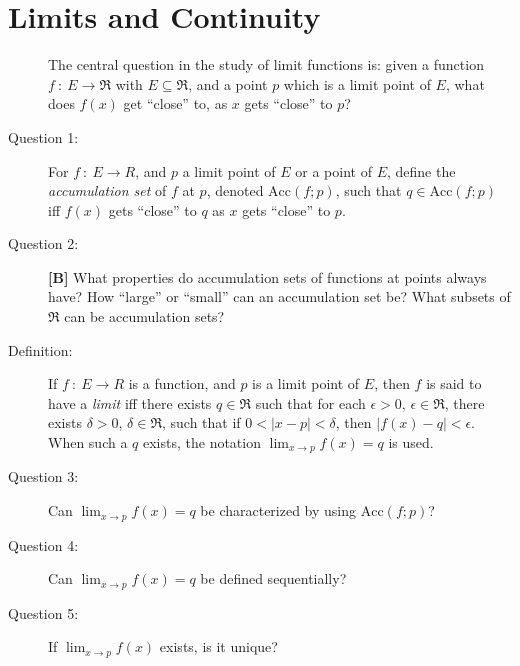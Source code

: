 \documentclass{article}
\begin{document}
\newpage

\section{Limits and Continuity}

\begin{description}

  \item[] The central question in the study of limit functions is: given a function $f\ :\ E \to \Re$ with $E \subseteq \Re$, and a point $p$ which is a limit point of $E$, what does $f(x)$ get ``close'' to, as $x$ gets ``close'' to $p$?

  \item[Question 1:] For $f\ :\ E \to R$, and $p$ a limit point of $E$ or a point of $E$, define the \emph{accumulation set} of $f$ at $p$, denoted $\text{Acc} (f;p)$, such that $q \in \text{Acc} (f;p)$ iff $f(x)$ gets ``close'' to $q$ as $x$ gets ``close'' to $p$.

  \item[Question 2:] \textbf{[B]} What properties do accumulation sets of functions at points always have? How ``large'' or ``small'' can an accumulation set be? What subsets of $\Re$ can be accumulation sets?

  \item[Definition:] If $f\ :\ E \to R$ is a function, and $p$ is a limit point of $E$, then $f$ is said to have a \emph{limit} iff there exists $q \in \Re$ such that for each $\epsilon > 0$, $\epsilon \in \Re$, there exists $\delta > 0$, $\delta \in \Re$, such that if $0 < |x-p| < \delta$, then $|f(x) - q| < \epsilon$. When such a $q$ exists, the notation $\displaystyle \lim_{x \to p} f(x) = q$ is used.

  \item[Question 3:] Can $\displaystyle \lim_{x \to p} f(x) = q$ be characterized by using $\text{Acc} (f;p)$?

  \item[Question 4:] Can $\displaystyle \lim_{x \to p} f(x) = q$ be defined sequentially?

  \item[Question 5:] If $\displaystyle \lim_{x \to p} f(x)$ exists, is it unique?


\end{description}
\end{document}
